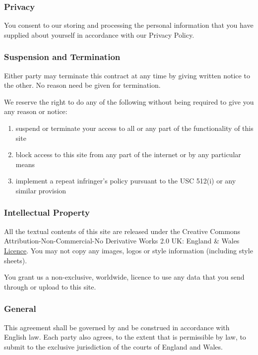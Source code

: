 \subsubsection{Privacy}

You consent to our storing and processing the personal information that
you have supplied about yourself in accordance with our Privacy Policy.

\subsubsection{Suspension and Termination}

Either party may terminate this contract at any time by giving written
notice to the other. No reason need be given for termination.

We reserve the right to do any of the following without being required
to give you any reason or notice:

\begin{enumerate}

\item
  suspend or terminate your access to all or any part of the
  functionality of this site
\item
  block access to this site from any part of the internet or by any
  particular means
\item
  implement a repeat infringer's policy pursuant to the USC 512(i) or
  any similar provision
\end{enumerate}

\subsubsection{Intellectual Property}

All the textual contents of this site are released under the {Creative
Commons Attribution-Non-Commercial-No Derivative Works 2.0 UK: England
\& Wales
\href{http://creativecommons.org/licenses/by-nc-nd/2.0/uk/}{Licence}}.
You may not copy any images, logos or style information (including style
sheets).

You grant us a non-exclusive, worldwide, licence to use any data that
you send through or upload to this site.

\subsubsection{General}

This agreement shall be governed by and be construed in accordance with
English law. Each party also agrees, to the extent that is permissible
by law, to submit to the exclusive jurisdiction of the courts of England
and Wales.

